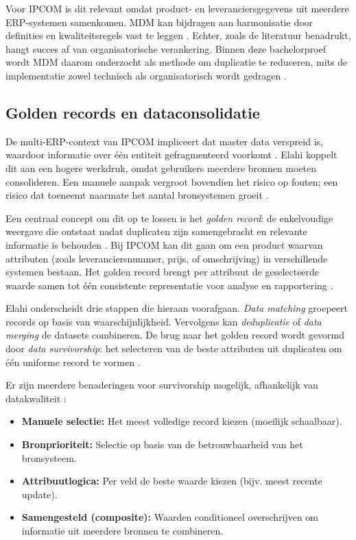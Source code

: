 Voor IPCOM is dit relevant omdat product- en leveranciersgegevens uit meerdere ERP-systemen samenkomen. MDM kan bijdragen aan harmonisatie door definities en kwaliteitsregels vast te leggen \autocite{Hikmawati}. Echter, zoals de literatuur benadrukt, hangt succes af van organisatorische verankering. Binnen deze bachelorproef wordt MDM daarom onderzocht als methode om duplicatie te reduceren, mits de implementatie zowel technisch als organisatorisch wordt gedragen \autocite{Hikmawati}.

\subsection{Golden records en dataconsolidatie}
De multi-ERP-context van IPCOM impliceert dat master data verspreid is, waardoor informatie over één entiteit gefragmenteerd voorkomt \autocite{Elahi}. Elahi koppelt dit aan een hogere werkdruk, omdat gebruikers meerdere bronnen moeten consolideren. Een manuele aanpak vergroot bovendien het risico op fouten; een risico dat toeneemt naarmate het aantal bronsystemen groeit \autocite{Elahi}.

Een centraal concept om dit op te lossen is het \emph{golden record}: de enkelvoudige weergave die ontstaat nadat duplicaten zijn samengebracht en relevante informatie is behouden \autocite{Elahi}. Bij IPCOM kan dit gaan om een product waarvan attributen (zoals leveranciersnummer, prijs, of omschrijving) in verschillende systemen bestaan. Het golden record brengt per attribuut de geselecteerde waarde samen tot één consistente representatie voor analyse en rapportering \autocite{Elahi}.



Elahi onderscheidt drie stappen die hieraan voorafgaan. \emph{Data matching} groepeert records op basis van waarschijnlijkheid. Vervolgens kan \emph{deduplicatie} of \emph{data merging} de datasets combineren. De brug naar het golden record wordt gevormd door \emph{data survivorship}: het selecteren van de beste attributen uit duplicaten om één uniforme record te vormen \autocite{Elahi}.

Er zijn meerdere benaderingen voor survivorship mogelijk, afhankelijk van datakwaliteit \autocite{Elahi}:
\begin{itemize}
    \item \textbf{Manuele selectie:} Het meest volledige record kiezen (moeilijk schaalbaar).
    \item \textbf{Bronprioriteit:} Selectie op basis van de betrouwbaarheid van het bronsysteem.
    \item \textbf{Attribuutlogica:} Per veld de beste waarde kiezen (bijv. meest recente update).
    \item \textbf{Samengesteld (composite):} Waarden conditioneel overschrijven om informatie uit meerdere bronnen te combineren.
\end{itemize}

